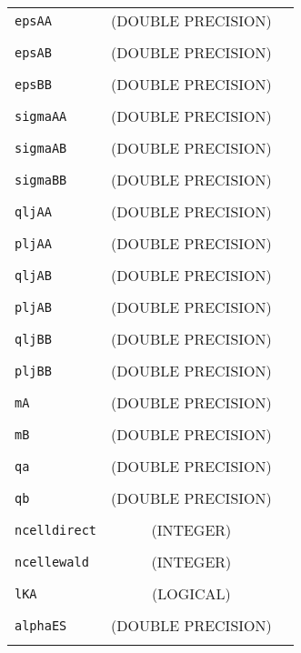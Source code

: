 \documentclass[10pt,a4paper]{article}
\begin{document}
\begin{tabular}{lcc}
\\
\verb?epsAA? &   (DOUBLE PRECISION)  & \\
\\
\verb?epsAB? &   (DOUBLE PRECISION)  & \\
\\
\verb?epsBB? &  (DOUBLE PRECISION)  & \\
\\
\verb?sigmaAA? & (DOUBLE PRECISION)  & \\
\\
\verb?sigmaAB? & (DOUBLE PRECISION)  & \\
\\
\verb?sigmaBB? & (DOUBLE PRECISION)  & \\
\\
\verb?qljAA? &  (DOUBLE PRECISION)  & \\
\\
\verb?pljAA? &  (DOUBLE PRECISION)  & \\
\\
\verb?qljAB? &  (DOUBLE PRECISION)  & \\
\\
\verb?pljAB? &  (DOUBLE PRECISION)  & \\
\\
\verb?qljBB? &  (DOUBLE PRECISION)  & \\
\\
\verb?pljBB? &  (DOUBLE PRECISION)  & \\
\\
\verb?mA?   &   (DOUBLE PRECISION)  & \\
\\
\verb?mB?   &   (DOUBLE PRECISION)  & \\
\\
\verb?qa?   &    (DOUBLE PRECISION)  & \\
\\
\verb?qb?   &    (DOUBLE PRECISION)  & \\
\\
\verb?ncelldirect? & (INTEGER)  & \\
\\
\verb?ncellewald?  &  (INTEGER)  & \\
\\
\verb?lKA?         &  (LOGICAL)  & \\
\\
\verb?alphaES?     &  (DOUBLE PRECISION)  & \\
\\
\end{tabular}
\end{document}

